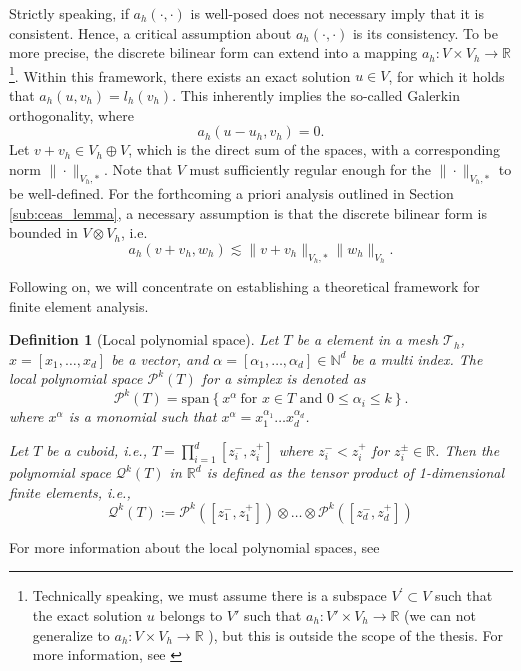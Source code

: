 \documentclass[11pt]{article}
\newtheorem{definition}[theorem]{Definition}
\theoremstyle{remark}
\renewcommand{\le}{\leqslant}
\numberwithin{equation}{section}
\begin{document}
Strictly speaking, if $a_{h}( \cdot ,\cdot ) $ is well-posed does not necessary imply that it is consistent. Hence, a critical assumption about $a_{h}( \cdot ,\cdot )$ is its consistency. To be more precise, the discrete bilinear form can extend into a mapping $a_{h} : V \times V_{h} \to \mathbb{R}$
\footnote{
Technically speaking, we must assume there is a subspace $V^{'} \subset V$  such that the exact solution $u$  belongs to $ V'  $ such that $a_{h}: V' \times V_{h} \to \mathbb{R} $ (we can not generalize to $a_{h} : V \times
V_{h} \to \mathbb{R} $ ), but this is outside the scope of the thesis. For more information, see \cite[Definition 1.31]{pietro2012}}. Within this framework, there exists an exact solution $u \in V$, for which it holds that $a_{h}( u,v_{h}) = l_{h}( v_{h})$. This inherently implies the so-called Galerkin orthogonality, where
\begin{equation}
    \label{eq:galerin_orth}
a_{h}( u - u_{h}, v_{h}) = 0.
\end{equation}
Let $v + v_{h} \in V_{h} \oplus V$, which is the direct sum of the spaces, with a corresponding norm $\| \cdot  \|_{V_{h},*  }^{  } $. Note that $V$ must sufficiently regular enough for the $\| \cdot  \|_{V_{h},*  }^{  } $ to be well-defined. For the forthcoming a priori analysis outlined in Section \ref{sub:ceas_lemma}, a necessary assumption is that the discrete bilinear form is bounded in $V \otimes V_{h}$, i.e.
\begin{equation}
    \label{eq:ah_star}
a_{h}( v + v_{h}, w_{h}) \lesssim  \| v + v_{h} \|_{ V_{h},* }^{  } \| w_{h} \|_{V_{h}  }^{  }.
\end{equation}


Following on, we will concentrate on establishing a theoretical framework for finite element analysis.
\begin{definition}[Local polynomial space]
    \label{def:local_space}
    Let $T$ be a element in a mesh $\mathcal{T}_{h} $,  $x = \left[ x_{1}, \ldots, x_{d} \right] $ be a vector, and $\alpha  = \left[ \alpha _{1}, \ldots, \alpha _{d} \right] \in \mathbb{N} ^{d} $ be a multi index.
    The local polynomial space $\mathcal{P} ^{k}( T) $ for a simplex is denoted as
    \begin{equation}
    \label{eq:pol_space}
        \mathcal{P}^{k}( T) =  \mathrm{span}\left\{ x^{\alpha } \ \text{for } x \in T \text{ and } 0 \le  \alpha _{i} \le k \right\}.
    \end{equation}
    where  $x^{\alpha }$ is a monomial such that $x^{\alpha } = x_{1}^{\alpha _{1}} \ldots x_{d}^{\alpha _{d}}$.

    Let $T$ be a cuboid, i.e.,  $T = \prod_{i=1}^{d} [z_{i}^{-},z_{i}^{+}]$ where $z_{i}^{-}< z_{i}^{+}$ for $z_{i}^{\pm} \in \mathbb{R} $. Then the polynomial space $\mathcal{Q}^{k}( T)$  in $\mathbb{R} ^{d}$ is defined as the tensor product of 1-dimensional
    finite elements, i.e.,
      \[
    \mathcal{Q} ^{k}(T)  := \mathcal{P}^{k}( [z_{1}^{-},z_{1}^{+}] ) \otimes \ldots \otimes \mathcal{P}^{k}( [z_{d}^{-},z_{d}^{+}] )
    \]
\end{definition}
For more information about the local polynomial spaces, see \cite[Chapter 6.4, 7.3]{ErnGuermond2021}
\end{document}
